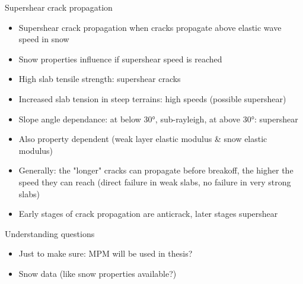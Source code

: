 \documentclass[11pt,aspectratio=169]{beamer}
\begin{document}
\begin{frame}[allowframebreaks]{Supershear crack propagation}
    \begin{itemize}
        \item Supershear crack propagation when cracks propagate above elastic wave speed in snow \parencite{trottetTransitionSubRayleighAnticrack2022}
        \item Snow properties influence if supershear speed is reached
        \item High slab tensile strength: supershear cracks \parencite{trottetTransitionSubRayleighAnticrack2022}
        \item Increased slab tension in steep terrains: high speeds (possible supershear) \parencite{trottetTransitionSubRayleighAnticrack2022}
        \item Slope angle dependance: at below 30°, sub-rayleigh, at above 30°: supershear \parencite{bobillierNumericalInvestigationCrack2024}
        \item Also property dependent (weak layer elastic modulus & snow elastic modulus) \parencite{bobillierNumericalInvestigationCrack2024}
        \item Generally: the "longer" cracks can propagate before breakoff, the higher the speed they can reach (direct failure in weak slabs, no failure in very strong slabs)
        \item Early stages of crack propagation are anticrack, later stages supershear \parencite{bergfeldSignaturesSubRayleighSupershear2025}
    \end{itemize}
    
\end{frame}


\begin{frame}{Understanding questions}
    \begin{itemize}
        \item Just to make sure: MPM will be used in thesis?
        \item Snow data (like snow properties available?)
    \end{itemize}
    
\end{frame}
\end{document}
